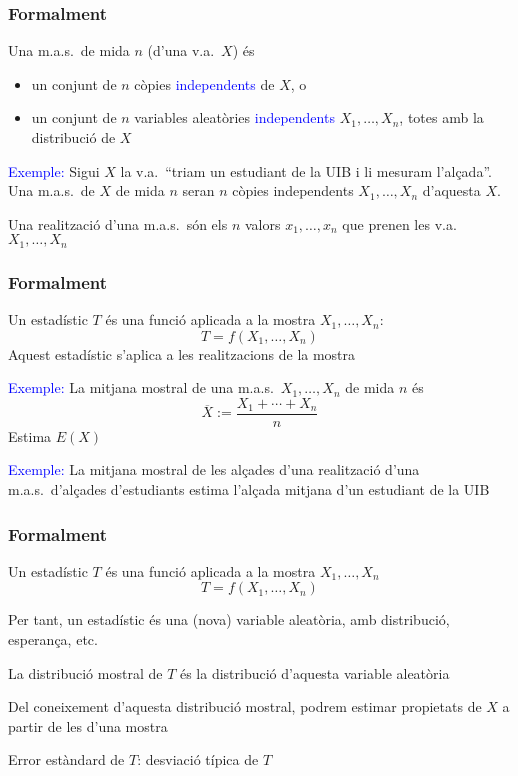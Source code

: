 \documentclass[12pt,t]{beamer}
\newcommand{\blue}[1]{\textcolor{blue}{#1}}
\renewcommand{\emph}[1]{{\color{red}#1}}
\theoremstyle{plain}
\theoremstyle{definition}
\begin{document}
\begin{frame}
\frametitle{Formalment}

Una \emph{m.a.s.\ de mida $n$} (d'una v.a.\ $X$) és
\begin{itemize}
\item  un conjunt de $n$ còpies \blue{independents} de $X$, o

\item un conjunt de $n$ variables aleatòries  \blue{independents} $X_1,\ldots,X_n$, totes amb la distribució de  $X$
\end{itemize}
\medskip


\blue{Exemple:} Sigui $X$ la v.a.\ ``triam un estudiant de la UIB i li mesuram l'alçada''. Una m.a.s.\ de $X$ de mida $n$ seran $n$ còpies independents $X_1,\ldots,X_n$ d'aquesta $X$.
\bigskip


Una \emph{realització} d'una m.a.s.\ són els $n$ valors $x_1,\ldots,x_n$ que prenen les v.a.\ $X_1,\ldots,X_n$

\end{frame}


\begin{frame}
\frametitle{Formalment}

Un  \emph{estadístic} $T$ és una funció aplicada a la mostra $X_1,\ldots,X_n$:
$$
T=f(X_1,\ldots,X_n)
$$
Aquest estadístic s'aplica a les realitzacions de la mostra
\medskip

\blue{Exemple:} La \emph{mitjana mostral} de una m.a.s.\ $X_1,\ldots,X_n$ de mida $n$ és 
$$
\overline{X}:=\frac{X_1+\cdots+X_n}{n}
$$
Estima $E(X)$
\medskip

\blue{Exemple:} La mitjana mostral de les alçades d'una  realització d'una m.a.s.\ d'alçades d'estudiants estima  l'alçada mitjana d'un estudiant de la UIB




\end{frame}


\begin{frame}
\frametitle{Formalment}

Un  \emph{estadístic} $T$ és una funció aplicada a la mostra $X_1,\ldots,X_n$
$$
T=f(X_1,\ldots,X_n)
$$
\medskip

Per tant, un estadístic és una (nova) variable aleatòria, amb distribució, esperança, etc.
\medskip

La \emph{distribució mostral} de $T$ és la distribució d'aquesta variable aleatòria
\medskip

Del coneixement d'aquesta distribució mostral, podrem estimar propietats de $X$ a partir de les  d'una mostra
\medskip

\emph{Error estàndard de $T$}: desviació típica de $T$


\end{frame}
\end{document}
